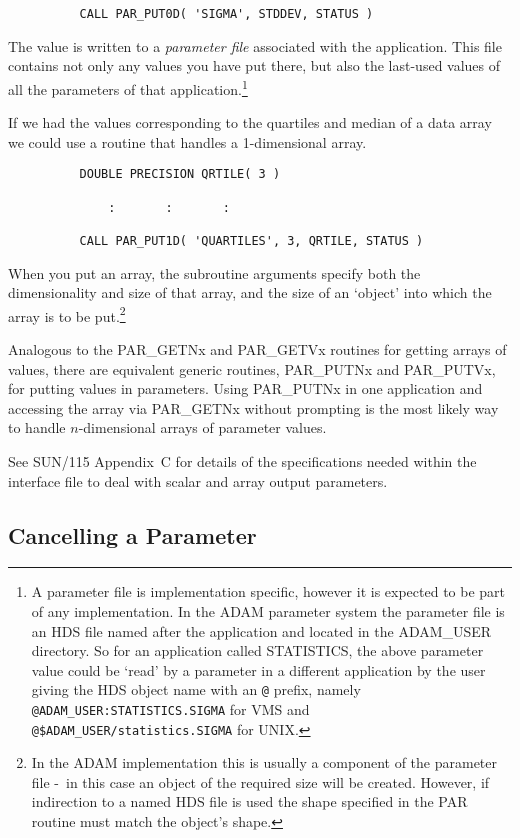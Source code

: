 \documentclass[twoside,11pt]{article}
\newcommand{\xref}[3]{#1}
\newcommand{\xlabel}[1]{}
\newcommand{\dash}{--}
\renewcommand{\dash}{-}
\begin{document}
\begin{verbatim}
          CALL PAR_PUT0D( 'SIGMA', STDDEV, STATUS )
\end{verbatim}

The value is written to a {\em parameter file\/} associated with the
application.  This file contains not only any values you have put there,
but also the last-used values of all the parameters of that
application.\footnote{A parameter file is implementation specific,
however it is expected to be part of any implementation.  In the ADAM
parameter system the parameter file is an HDS file named after the
application and located in the ADAM\_USER directory. So for an application
called STATISTICS, the above parameter value could be `read' by a
parameter in a different application by the user giving the HDS object
name with an {\tt @} prefix, namely {\tt @ADAM\_USER:STATISTICS.SIGMA}
for VMS and {\tt @\$ADAM\_USER/statistics.SIGMA} for UNIX.} 

If we had the values corresponding to the quartiles and median of a
data array we could use a routine that handles a 1-dimensional array.
\begin{verbatim}
          DOUBLE PRECISION QRTILE( 3 )

              :       :       :

          CALL PAR_PUT1D( 'QUARTILES', 3, QRTILE, STATUS )
\end{verbatim}

When you put an array, the subroutine arguments specify both the
dimensionality and size of that array, and the size of an `object' into
which the array is to be put.\footnote{In the ADAM implementation this
is usually a component of the parameter file \dash\ in this case an object of
the required size will be created.  However, if indirection to a named
HDS file is used the shape specified in the PAR routine must match the
object's shape.} 

Analogous to the PAR\_GETNx and PAR\_GETVx routines for getting arrays
of values, there are equivalent generic routines, PAR\_PUTNx and
PAR\_PUTVx, for putting values in parameters.  Using PAR\_PUTNx in one
application and accessing the array via PAR\_GETNx without prompting is
the most likely way to handle $n$-dimensional arrays of parameter
values. 

See 
\xref{SUN/115}{sun115}{} Appendix~C for details of the specifications needed within
the interface file to deal with scalar and array output parameters. 

\subsection{\xlabel{cancelling_a_parameter}Cancelling a Parameter}
\end{document}
